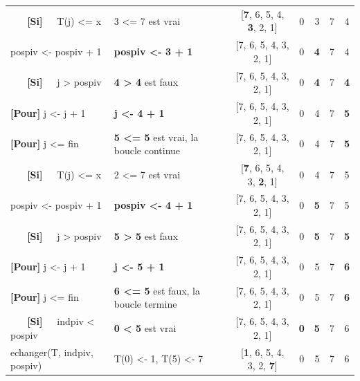 \documentclass[10pt]{article} %
\newcommand{\asgold}[1]{\textcolor{mygold}{{\bf#1}}}
\newcommand{\asgr}[1]{\textcolor{mygreen}{{\bf#1}}}
\newcommand{\aspurp}[1]{\textcolor{mypurp}{{\bf#1}}}
\begin{document}
\begin{table}[h!]
\begin{tabular}{ll|ccccc}
    \asgr{\ \ \ [Si]\ \ } T(j) \textless{}= x       & \cellcolor{mypurp} 3 \textless{}= 7 est vrai                                     & {[}\aspurp{7}, 6, 5, 4, \aspurp{3}, 2, 1{]} & 0      & 3      & 7 & 4 \\
    pospiv \textless{}- pospiv + 1  & \asgold{pospiv \textless{}- 3 + 1}               & {[}7, 6, 5, 4, 3, 2, 1{]} & 0      & \asgold{4}      & 7 & 4 \\
    \asgr{\ \ \ [Si]\ \ } j \textgreater{} pospiv     & \aspurp{4 \textgreater{} 4} est faux                                     & {[}7, 6, 5, 4, 3, 2, 1{]} & 0      & \aspurp{4}      & 7 & \aspurp{4} \\
    \asgr{[Pour]} j \textless{}- j + 1  &             \asgold{j \textless{}- 4 + 1}                                                   & {[}7, 6, 5, 4, 3, 2, 1{]} & 0      & 4      & 7 & \asgold{5} \\
    \asgr{[Pour]} j \textless{}= fin      & \aspurp{5 \textless{}= 5} est vrai, la boucle continue                 & {[}7, 6, 5, 4, 3, 2, 1{]} & 0      & 4      & 7 & \aspurp{5} \\
    \asgr{\ \ \ [Si]\ \ } T(j) \textless{}= x       & \cellcolor{mypurp} 2 \textless{}= 7 est vrai                                     & {[}\aspurp{7}, 6, 5, 4, 3, \aspurp{2}, 1{]} & 0      & 4      & 7 & 5 \\
    pospiv \textless{}- pospiv + 1  & \asgold{pospiv \textless{}- 4 + 1}               & {[}7, 6, 5, 4, 3, 2, 1{]} & 0      & \asgold{5}      & 7 & 5 \\
    \asgr{\ \ \ [Si]\ \ } j \textgreater{} pospiv     & \aspurp{5 \textgreater{} 5} est faux                                     & {[}7, 6, 5, 4, 3, 2, 1{]} & 0      & \aspurp{5}      & 7 & \aspurp{5} \\
    \asgr{[Pour]} j \textless{}- j + 1  &           \asgold{j \textless{}- 5 + 1}                                                     & {[}7, 6, 5, 4, 3, 2, 1{]} & 0      & 5      & 7 & \asgold{6} \\
    \asgr{[Pour]} j \textless{}= fin      & \aspurp{6 \textless{}= 5} est faux, la boucle termine                   & {[}7, 6, 5, 4, 3, 2, 1{]} & 0      & 5      & 7 & \aspurp{6} \\
    \asgr{\ \ \ [Si]\ \ } indpiv \textless{} pospiv   & \aspurp{0 \textless{} 5} est vrai                                        &  {[}7, 6, 5, 4, 3, 2, 1{]} & \aspurp{0}      & \aspurp{5}      & 7 & 6 \\
    echanger(T, indpiv, pospiv)    & \cellcolor{mygold} T(0) \textless{}- 1, T(5) \textless{}- 7                                        &  {[}\asgold{1}, 6, 5, 4, 3, 2, \asgold{7}{]}  & 0      & 5      & 7 & 6 \\
    \hline
    \end{tabular}
    \end{table}
\end{document}

